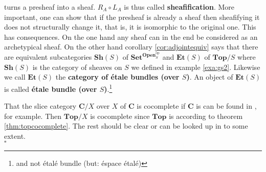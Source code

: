 \begin{exa}
turns a presheaf into a sheaf. $R_{A} \circ L_{A}$ is thus called \textbf{sheafification}. More important, one can show that if the presheaf is already a sheaf then sheafifying it does not structurally change it, that is, it is isomorphic to the original one. This has consequences. On the one hand any sheaf can in the end be considered as an archetypical sheaf. On the other hand corollary \ref{cor:adjointequiv} says that there are equivalent subcategories $\mathbf{Sh}(S)$ of $\mathbf{Set}^{\mathbf{Open}_{S}^{\textrm{op}}}$ and $\mathbf{Et}(S)$ of $\mathbf{Top} \slash S$ where $\mathbf{Sh}(S)$ is the category of sheaves on $S$ we defined in example \ref{exa:gs2}. Likewise we call $\mathbf{Et}(S)$ the \textbf{category of {\'e}tale bundles (over $S$)}. An object of $\mathbf{Et}(S)$ is called \textbf{{\'e}tale bundle (over $S$)}.\footnote{and not {\'e}tal{\'e} bundle (but: {\'e}space {\'e}tal{\'e})}
\end{exa}
\begin{prf}
That the slice category $\mathbf{C} \slash X$ over $X$ of $\mathbf{C}$ is cocomplete if $\mathbf{C}$ is can be found in \cite{52fbba46}, for example. Then $\mathbf{Top} \slash X$ is cocomplete since $\mathbf{Top}$ is according to theorem \ref{thm:topcocomplete}. The rest should be clear or can be looked up in \cite{c55c71e8} to some extent.
\\
\phantom{proven}
\hfill
$\square$
\end{prf}
